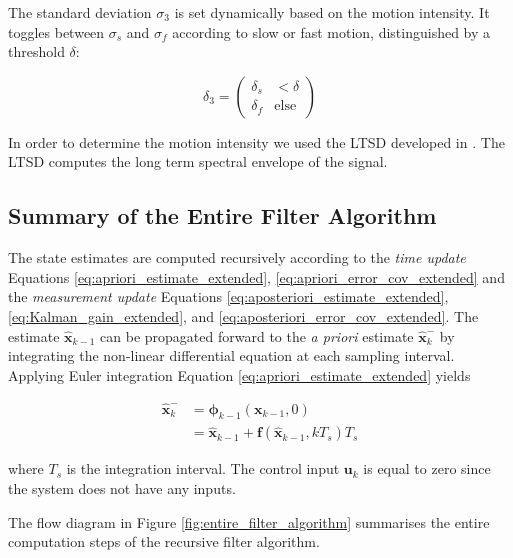 \noindent
The standard deviation $\sigma_3$ is set dynamically based on the motion intensity. It toggles between $\sigma_s$ and $\sigma_f$ according to slow or fast motion, distinguished by a threshold $\delta$:

\begin{equation}
  \delta_3 = \begin{pmatrix}
  	\delta_s & < \delta\\
  	\delta_f & \mbox{else}
  \end{pmatrix}
\end{equation}

In order to determine the motion intensity we used the \gls{LTSD} developed in \cite{olivares_vicente_gaitwatch_2013}. The \gls{LTSD} computes the long term spectral envelope of the signal.

\subsection{Summary of the Entire Filter Algorithm}

The state estimates are computed recursively according to the \emph{time update} Equations \ref{eq:apriori_estimate_extended}, \ref{eq:apriori_error_cov_extended} and the \emph{measurement update} Equations \ref{eq:aposteriori_estimate_extended}, \ref{eq:Kalman_gain_extended}, and \ref{eq:aposteriori_error_cov_extended}. The estimate $\hat{\mathbf{x}}_{k-1}$ can be propagated forward to the \emph{a priori} estimate $\hat{\mathbf{x}}^{-}_k$ by integrating the non-linear differential equation at each sampling interval. Applying Euler integration Equation \ref{eq:apriori_estimate_extended} yields

\begin{equation}\label{eq:apriori_estimate_extended}
\begin{split}
	\hat{\mathbf{x}}^{-}_k &= \bm{\phi}_{k-1}(\mathbf{x}_{k-1}, 0) \\
	&= \hat{\mathbf{x}}_{k-1} + \mathbf{f}(\hat{\mathbf{x}}_{k-1}, kT_s)T_s
\end{split}  
\end{equation}

\noindent
where $T_s$ is the integration interval. The control input $\mathbf{u}_k$ is equal to zero since the system does not have any inputs.

The flow diagram in Figure \ref{fig:entire_filter_algorithm} summarises the entire computation steps of the recursive filter algorithm.

